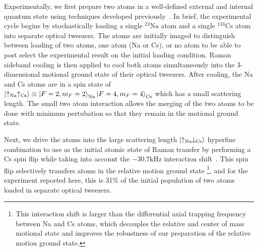 \documentclass[aps,prl,twocolumn,superscriptaddress]{revtex4-1}
\newcommand{\Na}{\mathrm{Na}}
\newcommand{\Cs}{\mathrm{Cs}}
\begin{document}
Experimentally, we first prepare two atoms in a well-defined external and internal quantum state using techniques developed previously~\cite{Liu2018, Liu2019, Wang2019}. In brief, the experimental cycle begins by stochastically loading a single ${}^{23}\mathrm{Na}$ atom and a single ${}^{133}\mathrm{Cs}$ atom into separate optical tweezers. The atoms are initially imaged to distinguish between loading of two atoms, one atom (Na or Cs), or no atom to be able to post select the experimental result on the initial loading condition. Raman sideband cooling is then applied to cool both atoms simultaneously into the 3-dimensional motional ground state of their optical tweezers. After cooling, the Na and Cs atoms are in a spin state of $\ket{\uparrow_{\Na}\uparrow_{\Cs}}\equiv \ket{F=2,m_F=2}_{\Na}\ket{F=4,m_F=4}_{\Cs} $ %
which has a small scattering length. The small two atom interaction allows the merging of the two atoms to be done with minimum pertubation so that they remain in the motional ground state.

Next, we  drive the atoms into the large scattering length $\ket{\uparrow_{\Na} \downarrow_{\Cs}}$ hyperfine combination to use as the initial atomic state of Raman transfer by performing a Cs spin flip while taking into account the $-30.7 \mathrm{kHz}$ interaction shift~\cite{Hood2019}.  %
This spin flip selectively transfers atoms in the relative motion ground state  \footnote{This interaction shift is larger than the differential axial trapping frequency between Na and Cs atoms, which decouples the relative and center of mass motional state and improves the robustness of our preparation of the relative motion ground state.}, and for the experiment reported here, this is 31\% of the initial population of two atoms loaded in separate optical tweezers.
\end{document}
